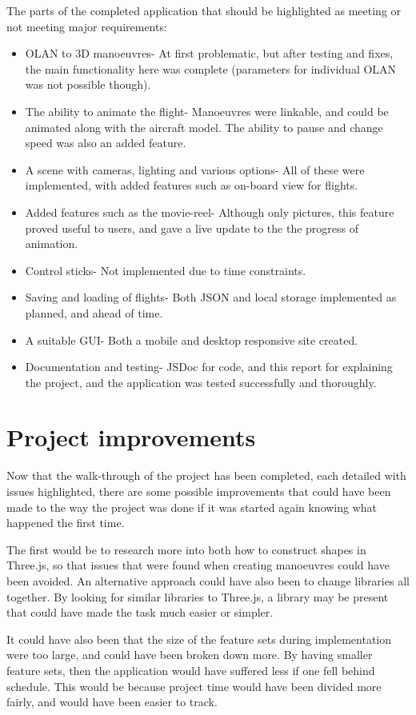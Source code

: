 The parts of the completed application that should be highlighted as meeting or not meeting major requirements:
\begin{itemize}
	\item OLAN to 3D manoeuvres- At first problematic, but after testing and fixes, the main functionality here was complete (parameters for individual OLAN was not possible though).
	\item The ability to animate the flight- Manoeuvres were linkable, and could be animated along with the aircraft model. The ability to pause and change speed was also an added feature.
	\item A scene with cameras, lighting and various options- All of these were implemented, with added features such as on-board view for flights.
	\item Added features such as the movie-reel- Although only pictures, this feature proved useful to users, and gave a live update to the the progress of animation.
	\item Control sticks- Not implemented due to time constraints.
	\item Saving and loading of flights- Both JSON and local storage implemented as planned, and ahead of time.
	\item A suitable GUI- Both a mobile and desktop responsive site created.
	\item Documentation and testing- JSDoc for code, and this report for explaining the project, and the application was tested successfully and thoroughly.
\end{itemize}

\section{Project improvements}
Now that the walk-through of the project has been completed, each detailed with issues highlighted, there are some possible improvements that could have been made to the way the project was done if it was started again knowing what happened the first time.

The first would be to research more into both how to construct shapes in Three.js, so that issues that were found when creating manoeuvres could have been avoided. An alternative approach could have also been to change libraries all together. By looking for similar libraries to Three.js, a library may be present that could have made the task much easier or simpler. 

It could have also been that the size of the feature sets during implementation were too large, and could have been broken down more. By having smaller feature sets, then the application would have suffered less if one fell behind schedule. This would be because project time would have been divided more fairly, and would have been easier to track.

